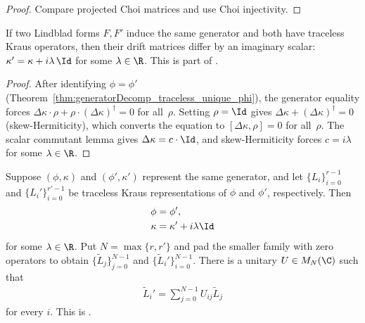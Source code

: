 \begin{proof}\leanok
    Compare projected Choi matrices and use Choi injectivity.
\end{proof}

\begin{theorem}
    \label{thm:generatorDecomp_traceless_unique_kappa}
    \leanok
    If two Lindblad forms $F,F'$ induce the same generator and
    both have traceless Kraus operators, then their drift matrices
    differ by an imaginary scalar: $\kappa' = \kappa+i\lambda\,\Id$
    for some $\lambda \in \R$.
    This is part of \cite[Proposition~7.4(2)]{Wolf2012Quantum}.
\end{theorem}

\begin{proof}\leanok
    After identifying $\phi = \phi'$
    (Theorem~\ref{thm:generatorDecomp_traceless_unique_phi}),
    the generator equality forces
    $\Delta\kappa\cdot\rho+\rho\cdot(\Delta\kappa)^\dagger=0$
    for all~$\rho$. Setting $\rho=\Id$ gives
    $\Delta\kappa+(\Delta\kappa)^\dagger=0$
    (skew-Hermiticity), which converts the equation to
    $[\Delta\kappa,\rho]=0$ for all~$\rho$.
    The scalar commutant lemma gives $\Delta\kappa=c\cdot\Id$,
    and skew-Hermiticity forces $c=i\lambda$ for some $\lambda\in\R$.
\end{proof}

\begin{theorem}
    \label{thm:generatorDecomp_traceless_unique}
    \leanok
    Suppose $(\phi,\kappa)$ and $(\phi',\kappa')$ represent the same
    generator, and let $\{L_i\}_{i=0}^{r-1}$ and
    $\{L_i'\}_{i=0}^{r'-1}$ be traceless Kraus representations of
    $\phi$ and $\phi'$, respectively. Then
    \begin{align}
        \phi&=\phi', \notag\\
        \kappa&=\kappa'+i\lambda\Id \label{eq:semigroup_drift_unique}
    \end{align}
    for some $\lambda\in\R$. Put $N=\max\{r,r'\}$ and pad the smaller
    family with zero operators to obtain
    $\{\widetilde L_j\}_{j=0}^{N-1}$ and
    $\{\widetilde L_i'\}_{i=0}^{N-1}$. There is a unitary
    $U\in M_N(\C)$ such that
    \begin{align}
        \widetilde L_i'=\sum_{j=0}^{N-1}U_{ij}\widetilde L_j
        \label{eq:semigroup_kraus_unitary}
    \end{align}
    for every $i$. This is \cite[Proposition~7.4(2)]{Wolf2012Quantum}.
\end{theorem}

